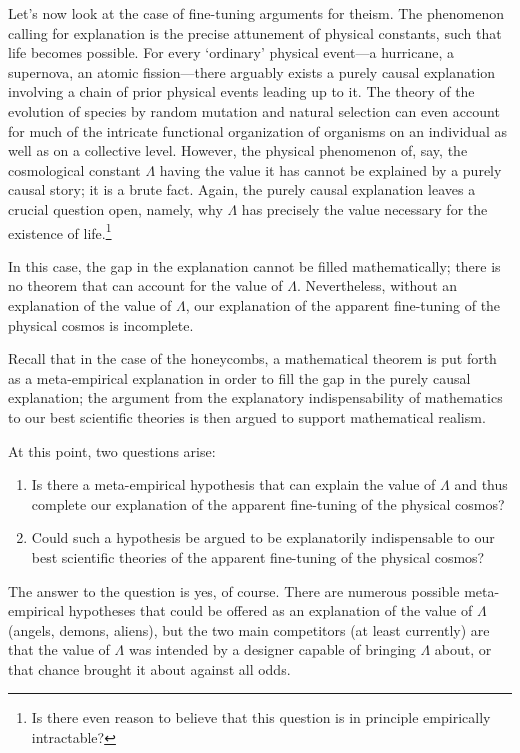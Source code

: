 \documentclass[a4paper,12pt]{article}
\begin{document}
Let's now look at the case of fine-tuning arguments for theism. The phenomenon calling for explanation is the precise attunement of physical constants, such that life becomes possible. For every `ordinary' physical event---a hurricane, a supernova, an atomic fission---there arguably exists a purely causal explanation involving a chain of prior physical events leading up to it.
The theory of the evolution of species by random mutation and natural selection can even account for much of the intricate functional organization of organisms on an individual as well as on a collective level. However, the physical phenomenon of, say, the cosmological constant $\Lambda$ having the value it has cannot be explained by a purely causal story; it is a brute fact. Again, the purely causal explanation leaves a crucial question open, namely, why $\Lambda$ has precisely the value necessary for the existence of life.\footnote{Is there even reason to believe that this question is in principle empirically intractable?}

In this case, the gap in the explanation cannot be filled mathematically; there is no theorem that can account for the value of $\Lambda$. Nevertheless, without an explanation of the value of $\Lambda$, our explanation of the apparent fine-tuning of the physical cosmos is incomplete.

Recall that in the case of the honeycombs, a mathematical theorem is put forth as a meta-empirical explanation in order to fill the gap in the purely causal explanation; the argument from the explanatory indispensability of mathematics to our best scientific theories is then argued to support mathematical realism.

At this point, two questions arise:


\begin{enumerate}
\item Is there a meta-empirical hypothesis that can explain the value of $\Lambda$ and thus complete our explanation of the apparent fine-tuning of the physical cosmos?

\item Could such a hypothesis be argued to be explanatorily indispensable to our best scientific theories of the apparent fine-tuning of the physical cosmos?
\end{enumerate}


The answer to the question is yes, of course. There are numerous possible meta-empirical hypotheses that could be offered as an explanation of the value of $\Lambda$ (angels, demons, aliens), but the two main competitors (at least currently) are that the value of $\Lambda$ was intended by a designer capable of bringing $\Lambda$ about, or that chance brought it about against all odds.
\end{document}
